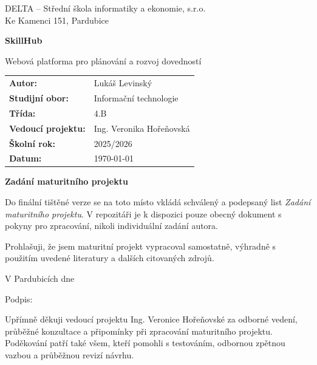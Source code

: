 \documentclass[12pt,a4paper]{report}
\newcommand{\studyField}{Informační technologie}
\newcommand{\className}{4.B}
\begin{document}
\hypersetup{pageanchor=false}

\begin{titlepage}
\centering

{\large DELTA -- Střední škola informatiky a ekonomie, s.r.o.\\
Ke Kamenci 151, Pardubice\par}
\vspace{1.8cm}

{\Huge \textbf{SkillHub}\par}
\vspace{0.3cm}
{\Large Webová platforma pro plánování a rozvoj dovedností\par}
\vspace{1.8cm}

\begin{tabular}{>{\bfseries}l l}
Autor: & Lukáš Levinský \\
Studijní obor: & \studyField \\
Třída: & \className \\
Vedoucí projektu: & Ing. Veronika Hořeňovská \\
Školní rok: & 2025/2026 \\
Datum: & \today \\
\end{tabular}

\end{titlepage}

\clearpage
\thispagestyle{empty}
\begin{center}
\textbf{Zadání maturitního projektu}
\end{center}
\vspace{1cm}
Do finální tištěné verze se na toto místo vkládá schválený a podepsaný list \textit{Zadání maturitního projektu}. V repozitáři je k dispozici pouze obecný dokument s pokyny pro zpracování, nikoli individuální zadání autora.

\clearpage
\thispagestyle{empty}
Prohlašuji, že jsem maturitní projekt vypracoval samostatně, výhradně s použitím uvedené literatury a dalších citovaných zdrojů.

\vspace{1.6cm}
V Pardubicích dne \dotfill

\vspace{1.6cm}
Podpis: \dotfill

\clearpage
\thispagestyle{empty}
Upřímně děkuji vedoucí projektu Ing. Veronice Hořeňovské za odborné vedení, průběžné konzultace a připomínky při zpracování maturitního projektu. Poděkování patří také všem, kteří pomohli s testováním, odbornou zpětnou vazbou a průběžnou revizí návrhu.
\end{document}
